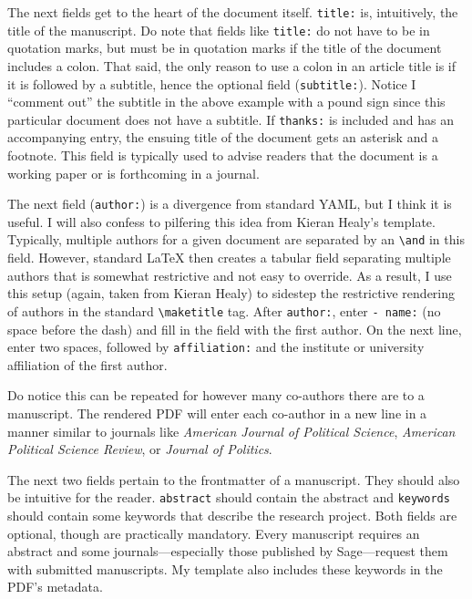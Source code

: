 \documentclass[11pt,]{article}
\begin{document}
The next fields get to the heart of the document itself. \texttt{title:}
is, intuitively, the title of the manuscript. Do note that fields like
\texttt{title:} do not have to be in quotation marks, but must be in
quotation marks if the title of the document includes a colon. That
said, the only reason to use a colon in an article title is if it is
followed by a subtitle, hence the optional field (\texttt{subtitle:}).
Notice I ``comment out'' the subtitle in the above example with a pound
sign since this particular document does not have a subtitle. If
\texttt{thanks:} is included and has an accompanying entry, the ensuing
title of the document gets an asterisk and a footnote. This field is
typically used to advise readers that the document is a working paper or
is forthcoming in a journal.

The next field (\texttt{author:}) is a divergence from standard YAML,
but I think it is useful. I will also confess to pilfering this idea
from Kieran Healy's template. Typically, multiple authors for a given
document are separated by an \texttt{\textbackslash{}and} in this field.
However, standard LaTeX then creates a tabular field separating multiple
authors that is somewhat restrictive and not easy to override. As a
result, I use this setup (again, taken from Kieran Healy) to sidestep
the restrictive rendering of authors in the standard
\texttt{\textbackslash{}maketitle} tag. After \texttt{author:}, enter
\texttt{-\ name:} (no space before the dash) and fill in the field with
the first author. On the next line, enter two spaces, followed by
\texttt{affiliation:} and the institute or university affiliation of the
first author.

Do notice this can be repeated for however many co-authors there are to
a manuscript. The rendered PDF will enter each co-author in a new line
in a manner similar to journals like \emph{American Journal of Political
Science}, \emph{American Political Science Review}, or \emph{Journal of
Politics}.

The next two fields pertain to the frontmatter of a manuscript. They
should also be intuitive for the reader. \texttt{abstract} should
contain the abstract and \texttt{keywords} should contain some keywords
that describe the research project. Both fields are optional, though are
practically mandatory. Every manuscript requires an abstract and some
journals---especially those published by Sage---request them with
submitted manuscripts. My template also includes these keywords in the
PDF's metadata.
\end{document}
